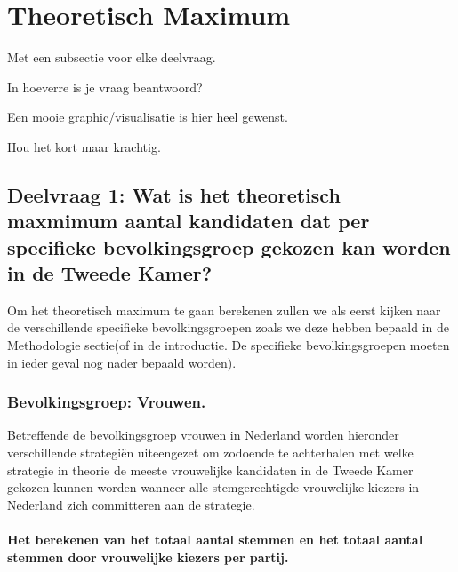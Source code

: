 \section{Theoretisch Maximum}
\label{sec:eva}

Met een subsectie voor elke deelvraag.

In hoeverre is je vraag beantwoord?

Een mooie graphic/visualisatie is hier heel gewenst.

Hou het kort maar krachtig.

\newpage
\subsection{Deelvraag 1: Wat is het theoretisch maxmimum aantal kandidaten dat per specifieke bevolkingsgroep gekozen kan worden in de Tweede Kamer?}

Om het theoretisch maximum te gaan berekenen zullen we als eerst kijken naar de verschillende specifieke bevolkingsgroepen zoals we deze hebben bepaald in de Methodologie sectie(of in de introductie. De specifieke bevolkingsgroepen moeten in ieder geval nog nader bepaald worden).

\subsubsection{Bevolkingsgroep: Vrouwen.}

Betreffende de bevolkingsgroep vrouwen in Nederland worden hieronder verschillende strategi\"{e}n uiteengezet om zodoende te achterhalen met welke strategie in theorie de meeste vrouwelijke kandidaten in de Tweede Kamer gekozen kunnen worden wanneer alle stemgerechtigde vrouwelijke kiezers in Nederland zich committeren aan de strategie.

\paragraph{Het berekenen van het totaal aantal stemmen en het totaal aantal stemmen door vrouwelijke kiezers per partij.}

